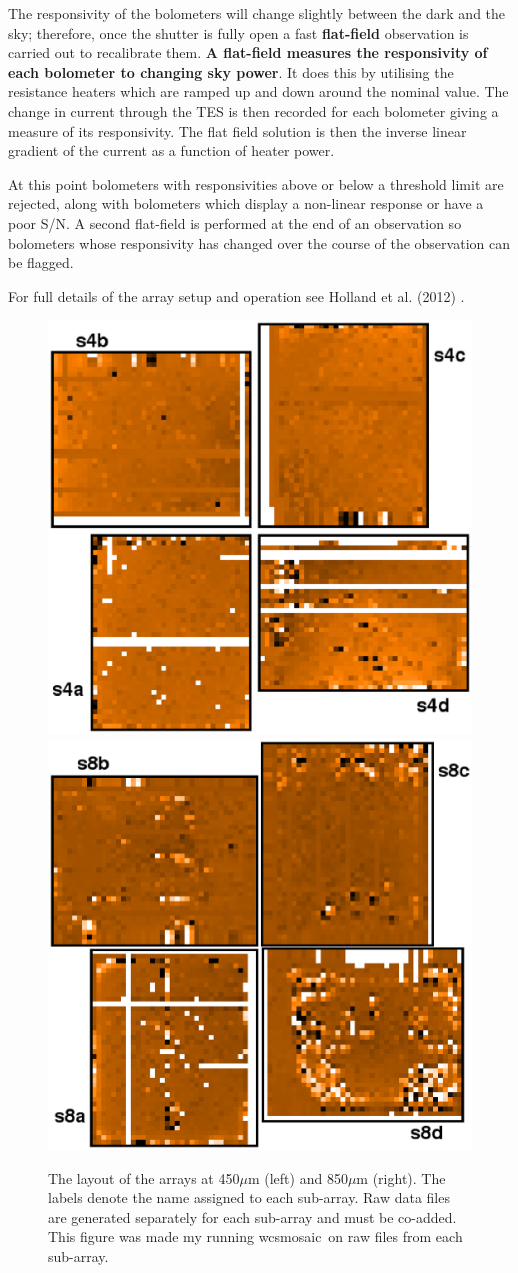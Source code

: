 \documentclass[twoside,11pt]{article}
\newcommand{\xref}[3]{#1}
\renewcommand{\_}{\texttt{\symbol{95}}}
\newcommand{\arcmin}{\mbox{$^\prime$}}
\newcommand{\arcsec}{\arcmin\hspace*{-0.1em}\arcmin}
\newcommand{\task}[1]{\textsf{#1}}
\newcommand{\wcsmosaic}{\xref{\task{wcsmosaic}}{sun95}{WCSMOSAIC}}
\begin{document}
The responsivity of the bolometers will change slightly between the
dark and the sky; therefore, once the shutter is fully open a fast
\textbf{flat-field} observation is carried out to recalibrate them.
\textbf{A flat-field measures the responsivity of each bolometer to
changing sky power}. It does this by utilising the resistance heaters
which are ramped up and down around the nominal value. The change in
current through the TES is then recorded for each bolometer giving a
measure of its responsivity. The flat field solution is then the
inverse linear gradient of the current as a function of heater power.

At this point bolometers with responsivities above or below a
threshold limit are rejected, along with bolometers which display a
non-linear response or have a poor S/N.  A second flat-field is
performed at the end of an observation so bolometers whose
responsivity has changed over the course of the observation can be
flagged.


For full details of the array setup and operation see Holland et al.
(2012) \cite{s2main}.

\begin{figure}[t!]
\begin{center}
\includegraphics[width=0.4\linewidth]{sc21_450array.eps}
\hspace{1cm}
\includegraphics[width=0.4\linewidth]{sc21_850array.eps}
\label{fig:arrays}
\caption{\small The layout of the arrays at 450$\mu$m (left) and
850$\mu$m (right). The labels denote the name assigned to each
sub-array. Raw data files are generated separately for each sub-array
and must be co-added. This figure was made my running \wcsmosaic\ on
raw files from each sub-array.}
\end{center}
\end{figure}
\end{document}
